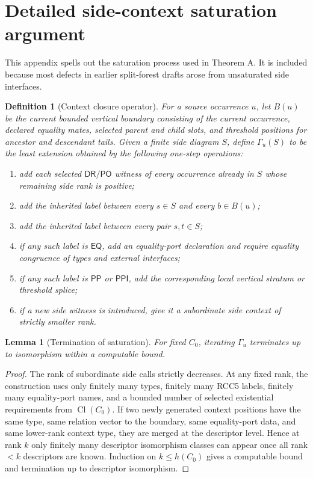 \documentclass[11pt]{article}
\newtheorem{lemma}[theorem]{Lemma}
\newtheorem{definition}[theorem]{Definition}
\newcommand{\EQ}{\mathsf{EQ}}
\newcommand{\PP}{\mathsf{PP}}
\newcommand{\PPI}{\mathsf{PPI}}
\newcommand{\PO}{\mathsf{PO}}
\newcommand{\DR}{\mathsf{DR}}
\newcommand{\Cl}{\operatorname{Cl}}
\begin{document}
\appendix

\section{Detailed side-context saturation argument}

This appendix spells out the saturation process used in Theorem A.  It is included because most defects in earlier split-forest drafts arose from unsaturated side interfaces.

\begin{definition}[Context closure operator]
For a source occurrence $u$, let $B(u)$ be the current bounded vertical boundary consisting of the current occurrence, declared equality mates, selected parent and child slots, and threshold positions for ancestor and descendant tails.  Given a finite side diagram $S$, define $\Gamma_u(S)$ to be the least extension obtained by the following one-step operations:
\begin{enumerate}[label=(G\arabic*)]
\item add each selected $\DR/\PO$ witness of every occurrence already in $S$ whose remaining side rank is positive;
\item add the inherited label between every $s\in S$ and every $b\in B(u)$;
\item add the inherited label between every pair $s,t\in S$;
\item if any such label is $\EQ$, add an equality-port declaration and require equality congruence of types and external interfaces;
\item if any such label is $\PP$ or $\PPI$, add the corresponding local vertical stratum or threshold splice;
\item if a new side witness is introduced, give it a subordinate side context of strictly smaller rank.
\end{enumerate}
\end{definition}

\begin{lemma}[Termination of saturation]
For fixed $C_0$, iterating $\Gamma_u$ terminates up to isomorphism within a computable bound.
\end{lemma}

\begin{proof}
The rank of subordinate side calls strictly decreases.  At any fixed rank, the construction uses only finitely many types, finitely many RCC5 labels, finitely many equality-port names, and a bounded number of selected existential requirements from $\Cl(C_0)$.  If two newly generated context positions have the same type, same relation vector to the boundary, same equality-port data, and same lower-rank context type, they are merged at the descriptor level.  Hence at rank $k$ only finitely many descriptor isomorphism classes can appear once all rank $<k$ descriptors are known.  Induction on $k\le h(C_0)$ gives a computable bound and termination up to descriptor isomorphism.
\end{proof}
\end{document}
